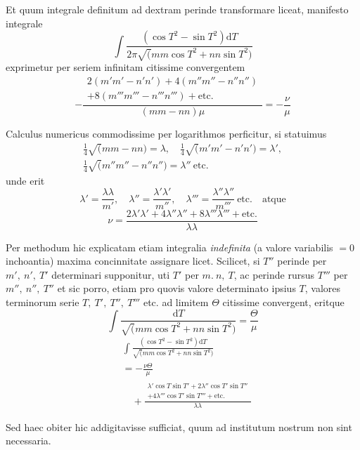 Et quum integrale definitum ad dextram perinde transformare liceat, manifesto
integrale
\[
\int\frac{(\cos T^2-\sin T^2)\mathrm{d}T}{2\pi\surd(mm\cos T^2+nn\sin T^2)}
\]
exprimetur per seriem infinitam citissime convergentem
\[
-\frac{\begin{gathered}2(m'm'-n'n')+4(m''m''-n''n'')\\+8(m'''m'''-n'''n''')+\mathrm{etc.}\end{gathered}}{(mm-nn)\mu}
=-\frac{\nu}{\mu}
\]
\par Calculus numericus commodissime per logarithmos perficitur, si statuimus
\[
\begin{gathered}\tfrac14\surd(mm-nn)=\lambda,\quad\tfrac14\surd(m'm'-n'n')=\lambda',\\[6pt]\tfrac14\surd(m''m''-n''n'')=\lambda''\ \mathrm{etc.}\end{gathered}
\]
unde erit
\[
\lambda'=\frac{\lambda\lambda}{m'},\quad
\lambda''=\frac{\lambda'\lambda'}{m''},\quad
\lambda'''=\frac{\lambda''\lambda''}{m'''}\ \mathrm{etc.}\quad\text{atque}
\]
\[
\nu=\frac{2\lambda'\lambda'+4\lambda''\lambda''+8\lambda'''\lambda'''+\mathrm{etc.}}{\lambda\lambda}
\]

Per methodum hic explicatam etiam integralia \textit{indefinita} (a valore variabilis
$=0$ inchoantia) maxima concinnitate assignare licet. Scilicet, si $T''$ perinde
per $m',\ n',\ T'$ determinari supponitur, uti $T'$ per $m.\ n,\ T$, ac perinde rursus
$T'''$ per $m'',\ n'',\ T''$ et sic porro, etiam pro quovis valore determinato ipsius $T$,
valores terminorum serie $T,\ T',\ T'',\ T'''$ etc. ad limitem $\Theta$ citissime convergent,
eritque
\[
\int\frac{\mathrm{d}T}{\surd(mm\cos T^2+nn\sin T^2)}=\frac{\Theta}{\mu}
\]
\[
\begin{aligned}&\int\frac{(\cos T^2-\sin T^2)\mathrm{d}T}{\surd(mm\cos T^2+nn\sin T^2)}\\[7pt]&=-\frac{\nu\Theta}{\mu}\\[7pt]&\quad+\frac{\begin{gathered}\lambda'\cos T\sin T'+2\lambda''\cos T'\sin T''\\+4\lambda'''\cos T'\sin T'''+\mathrm{etc.}\end{gathered}}{\lambda\lambda}\end{aligned}
\]
\par Sed haec obiter hic addigitavisse sufficiat, quum ad institutum nostrum non
sint necessaria.

